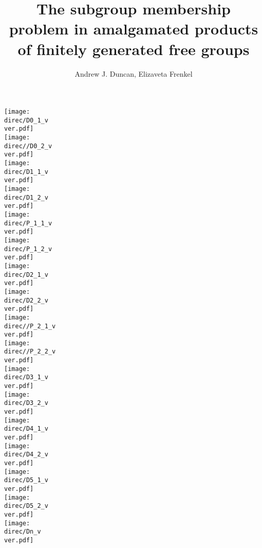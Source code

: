 \documentclass[a4paper,12pt]{article}
\title{The subgroup membership problem in amalgamated products of 
finitely generated free groups
}
\author{Andrew J. Duncan, Elizaveta Frenkel}
\newcommand{\direc}{input_K}
\newcommand{\ver}{2}
\numberwithin{equation}{section}
\numberwithin{figure}{section}
\begin{document}
\begin{comment}
\texttt{[image: \\direc/stallings1.pdf]}~~\texttt{[image: \\direc/stallings2.pdf]}\\
\texttt{[image: \\direc/double1.pdf]}\\
\texttt{[image: \\direc/double2.pdf]}\\
\texttt{[image: \\direc/Kfolding.pdf]}\\
\end{comment}
\texttt{[image: \\direc/D0\_1\_v\\ver.pdf]}\\
\texttt{[image: \\direc//D0\_2\_v\\ver.pdf]}\\
\texttt{[image: \\direc/D1\_1\_v\\ver.pdf]}\\
\texttt{[image: \\direc/D1\_2\_v\\ver.pdf]}\\
\texttt{[image: \\direc/P\_1\_1\_v\\ver.pdf]}\\
\texttt{[image: \\direc/P\_1\_2\_v\\ver.pdf]}\\
\texttt{[image: \\direc/D2\_1\_v\\ver.pdf]}\\
\texttt{[image: \\direc/D2\_2\_v\\ver.pdf]}\\
\texttt{[image: \\direc//P\_2\_1\_v\\ver.pdf]}\\
\texttt{[image: \\direc//P\_2\_2\_v\\ver.pdf]}\\
\texttt{[image: \\direc/D3\_1\_v\\ver.pdf]}\\
\texttt{[image: \\direc/D3\_2\_v\\ver.pdf]}\\
\texttt{[image: \\direc/D4\_1\_v\\ver.pdf]}\\
\texttt{[image: \\direc/D4\_2\_v\\ver.pdf]}\\
\texttt{[image: \\direc/D5\_1\_v\\ver.pdf]}\\
\texttt{[image: \\direc/D5\_2\_v\\ver.pdf]}\\
\texttt{[image: \\direc/Dn\_v\\ver.pdf]}\\
\begin{comment}
\texttt{[image: \\direc/D0\_1\_v2.pdf]}\\
\texttt{[image: \\direc//D0\_2\_v2.pdf]}\\
\texttt{[image: \\direc/D1\_1\_v2.pdf]}\\
\texttt{[image: \\direc/D1\_2\_v2.pdf]}\\
\texttt{[image: \\direc/Dn\_v2.pdf]}\\
\end{comment}
\end{document}
